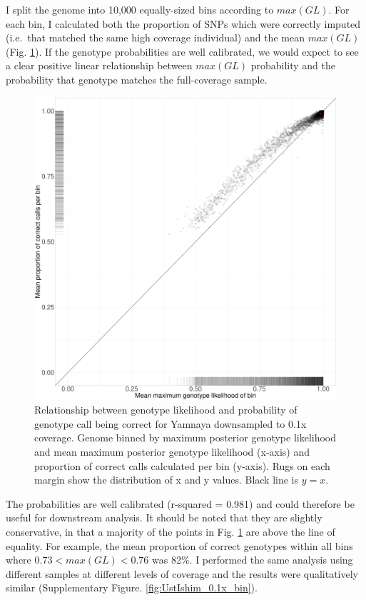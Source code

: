 {I split the genome into 10,000 equally-sized bins according to $max(GL)$. For each bin, I calculated both the proportion of SNPs which were correctly imputed (i.e.\ that matched the same high coverage individual) and the mean $max(GL)$ (Fig. \ref{fig:Yamnaya_0.1x_GL_calibration}). If the genotype probabilities are well calibrated, we would expect to see a clear positive linear relationship between $max(GL)$ probability and the probability that genotype matches the full-coverage sample.

\begin{figure}[htp]
    \centering
    \includegraphics[width=1.0\textwidth]{../images/chapter1/Yamnaya_0.1x_bin.pdf}
    \caption{Relationship between genotype likelihood and probability of genotype call being correct for Yamnaya downsampled to 0.1x coverage. Genome binned by maximum posterior genotype likelihood and mean maximum posterior genotype likelihood (x-axis) and proportion of correct calls calculated per bin (y-axis). Rugs on each margin show the distribution of x and y values. Black line is $y=x$.}
    \label{fig:Yamnaya_0.1x_GL_calibration}
\end{figure}

The probabilities are well calibrated (r-squared = 0.981) and could therefore be useful for downstream analysis. It should be noted that they are slightly conservative, in that a majority of the points in Fig. \ref{fig:Yamnaya_0.1x_GL_calibration} are above the line of equality. For example, the mean proportion of correct genotypes within all bins where $0.73 < max(GL) < 0.76$ was 82\%. I performed the same analysis using different samples at different levels of coverage and the results were qualitatively similar (Supplementary Figure. \ref{fig:UstIshim_0.1x_bin}).

}
